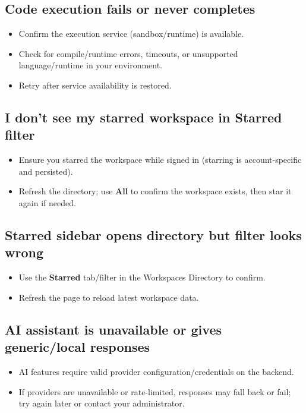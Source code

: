 \documentclass[11pt,a4paper]{article}
\begin{document}
\subsection{Code execution fails or never completes}
\begin{itemize}
  \item Confirm the execution service (sandbox/runtime) is available.
  \item Check for compile/runtime errors, timeouts, or unsupported language/runtime in your environment.
  \item Retry after service availability is restored.
\end{itemize}

\subsection{I don't see my starred workspace in Starred filter}
\begin{itemize}
  \item Ensure you starred the workspace while signed in (starring is account-specific and persisted).
  \item Refresh the directory; use \textbf{All} to confirm the workspace exists, then star it again if needed.
\end{itemize}

\subsection{Starred sidebar opens directory but filter looks wrong}
\begin{itemize}
  \item Use the \textbf{Starred} tab/filter in the Workspaces Directory to confirm.
  \item Refresh the page to reload latest workspace data.
\end{itemize}

\subsection{AI assistant is unavailable or gives generic/local responses}
\begin{itemize}
  \item AI features require valid provider configuration/credentials on the backend.
  \item If providers are unavailable or rate-limited, responses may fall back or fail; try again later or contact your administrator.
\end{itemize}
\end{document}

